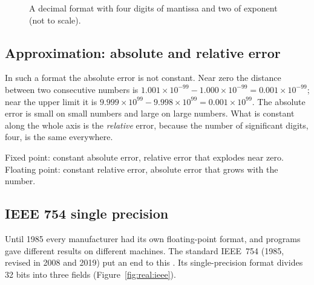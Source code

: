 \begin{figure}[htb]
\centering
{}
\caption{A decimal format with four digits of mantissa and two of exponent
(not to scale).}
\label{fig:real:line}
\end{figure}

\subsection{Approximation: absolute and relative error}

In such a format the absolute error is not constant. Near zero the distance
between two consecutive numbers is
$1.001\times 10^{-99}-1.000\times 10^{-99} = 0.001\times 10^{-99}$; near the
upper limit it is
$9.999\times 10^{99}-9.998\times 10^{99} = 0.001\times 10^{99}$. The absolute
error is small on small numbers and large on large numbers. What is constant
along the whole axis is the \emph{relative} error, because the number of
significant digits, four, is the same everywhere.

\begin{prgconcept}
Fixed point: constant absolute error, relative error that explodes near zero.
Floating point: constant relative error, absolute error that grows with the
number.
\end{prgconcept}

\subsection{IEEE 754 single precision}

Until 1985 every manufacturer had its own floating-point format, and programs
gave different results on different machines. The standard IEEE~754 (1985,
revised in 2008 and 2019) put an end to this \citep{ieee754}. Its
single-precision format divides 32 bits into three fields
(Figure~\ref{fig:real:ieee}).

